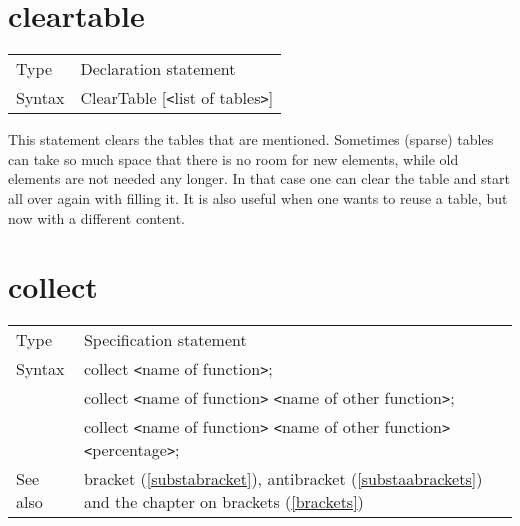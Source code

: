 
\section{cleartable}
\label{substacleartable}

\noindent \begin{tabular}{ll}
Type & Declaration statement\\
Syntax & ClearTable [{\tt<}list of tables{\tt>}]
\end{tabular} \vspace{4mm}

\noindent This statement clears the tables that are mentioned. Sometimes 
(sparse) tables can take so much space that there is no room for new 
elements, while old elements are not needed any longer. In that case one 
can clear the table and start all over again with filling it. It is also 
useful when one wants to reuse a table, but now with a different content.
\vspace{10mm}


\section{collect}
\label{substacollect}

\noindent \begin{tabular}{ll}
Type & Specification statement\\
Syntax & collect {\tt<}name of function{\tt>}; \\
       & collect {\tt<}name of function{\tt>} 
        {\tt<}name of other function{\tt>}; \\
       & collect {\tt<}name of function{\tt>} 
        {\tt<}name of other function{\tt>} {\tt<}percentage{\tt>};
\\ See also & bracket (\ref{substabracket}), antibracket 
     (\ref{substaabrackets}) and the chapter on brackets 
     (\ref{brackets})
\end{tabular} \vspace{4mm}

